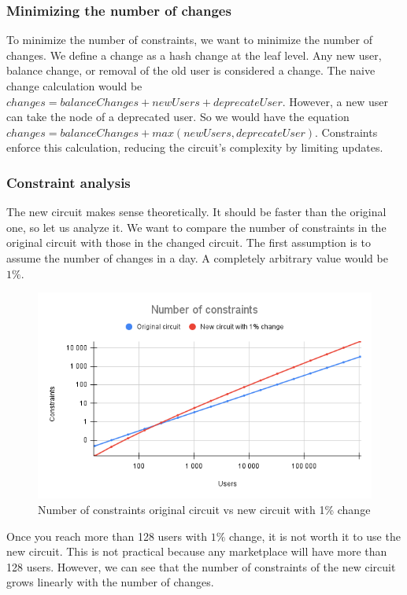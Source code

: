 \subsubsection{Minimizing the number of changes}
To minimize the number of constraints, we want to minimize the number of changes.
We define a change as a hash change at the leaf level. Any new user, balance change, or removal of the old user is considered a change.
The naive change calculation would be $changes = balanceChanges + newUsers + deprecateUser$.
However, a new user can take the node of a deprecated user. So we would have the equation $changes = balanceChanges + max(newUsers, deprecateUser)$. 
Constraints enforce this calculation, reducing the circuit's complexity by limiting updates.

\subsubsection{Constraint analysis}
The new circuit makes sense theoretically. It should be faster than the original one, so let us analyze it.
We want to compare the number of constraints in the original circuit with those in the changed circuit.
The first assumption is to assume the number of changes in a day. A completely arbitrary value would be $1\%$.
\begin{figure}[H]
   \centering
   \includegraphics[width=130mm]{Number of constraints.png}
   \caption{Number of constraints original circuit vs new circuit with 1\% change}
   \label{overflow}
   \end{figure}
Once you reach more than 128 users with $1\%$ change, it is not worth it to use the new circuit.
This is not practical because any marketplace will have more than 128 users.
However, we can see that the number of constraints of the new circuit grows linearly with the number of changes.
